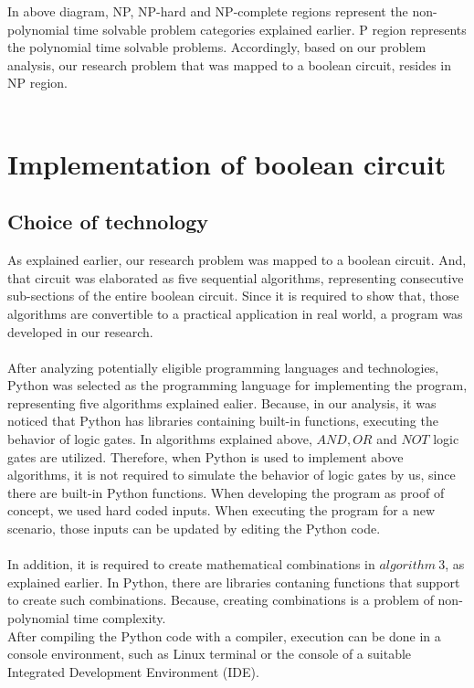 In above diagram, NP, NP-hard and NP-complete regions represent the non-polynomial time solvable problem categories explained earlier. P region represents the polynomial time solvable problems. Accordingly, based on our problem analysis, our research problem that was mapped to a boolean circuit, resides in NP region.\\ \\

\section{Implementation of boolean circuit}
\subsection{Choice of technology}
As explained earlier, our research problem was mapped to a boolean circuit. And, that circuit was elaborated as five sequential algorithms, representing consecutive sub-sections of the entire boolean circuit. Since it is required to show that, those algorithms are convertible to a practical application in real world, a program was developed in our research.\\ \\
After analyzing potentially eligible programming languages and technologies, Python was selected as the programming language for implementing the program, representing five algorithms explained ealier. Because, in our analysis, it was noticed that Python has libraries containing built-in functions, executing the behavior of logic gates. In algorithms explained above, $AND, OR$ and $NOT$ logic gates are utilized. Therefore, when Python is used to implement above algorithms, it is not required to simulate the behavior of logic gates by us, since there are built-in Python functions. When developing the program as proof of concept, we used hard coded inputs. When executing the program for a new scenario, those inputs can be updated by editing the Python code.\\ \\
In addition, it is required to create mathematical combinations in $algorithm\ 3$, as explained earlier. In Python, there are libraries contaning functions that support to create such combinations. Because, creating combinations is a problem of non-polynomial time complexity.\\
After compiling the Python code with a compiler, execution can be done in a console environment, such as Linux terminal or the console of a suitable Integrated Development Environment (IDE).\\

